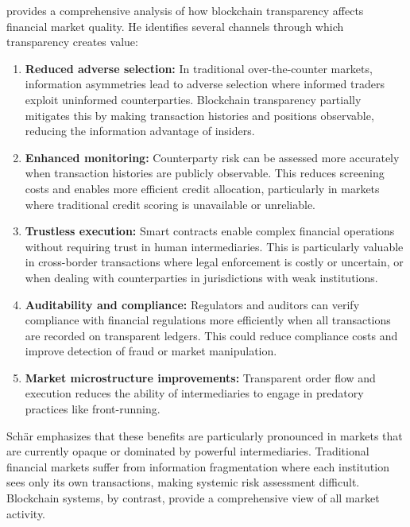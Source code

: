  provides a comprehensive analysis of how blockchain transparency affects financial market quality. He identifies several channels through which transparency creates value:

\begin{enumerate}
    \item \textbf{Reduced adverse selection:} In traditional over-the-counter markets, information asymmetries lead to adverse selection where informed traders exploit uninformed counterparties. Blockchain transparency partially mitigates this by making transaction histories and positions observable, reducing the information advantage of insiders.
    
    \item \textbf{Enhanced monitoring:} Counterparty risk can be assessed more accurately when transaction histories are publicly observable. This reduces screening costs and enables more efficient credit allocation, particularly in markets where traditional credit scoring is unavailable or unreliable.
    
    \item \textbf{Trustless execution:} Smart contracts enable complex financial operations without requiring trust in human intermediaries. This is particularly valuable in cross-border transactions where legal enforcement is costly or uncertain, or when dealing with counterparties in jurisdictions with weak institutions.
    
    \item \textbf{Auditability and compliance:} Regulators and auditors can verify compliance with financial regulations more efficiently when all transactions are recorded on transparent ledgers. This could reduce compliance costs and improve detection of fraud or market manipulation.
    
    \item \textbf{Market microstructure improvements:} Transparent order flow and execution reduces the ability of intermediaries to engage in predatory practices like front-running.
\end{enumerate}

Schär emphasizes that these benefits are particularly pronounced in markets that are currently opaque or dominated by powerful intermediaries. Traditional financial markets suffer from information fragmentation where each institution sees only its own transactions, making systemic risk assessment difficult. Blockchain systems, by contrast, provide a comprehensive view of all market activity.

